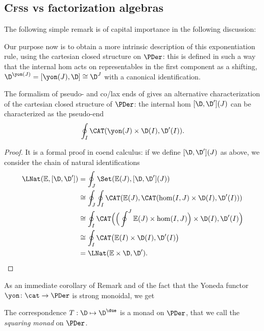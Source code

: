 \subsection{\textsc{Cfs}s vs factorization algebras}
The following simple remark is of capital importance in the following discussion:
\begin{remark}
Our purpose now is to obtain a more intrinsic description of this exponentiation rule, using the cartesian closed structure on $\PDer$: this is defined in such a way that the internal hom acts on representables in the first component as a shifting, \ie $\D^{\yon(J)} = [\yon(J),\D]\cong \D^J$ with a canonical identification. 
\end{remark}
\begin{remark}
The formalism of pseudo- and co/lax ends of \cite{bozapalides1975fins} gives an alternative characterization of the cartesian closed structure of $\PDer$: the internal hom $[\D,\D'](J)$ can be characterized as the pseudo-end
\[
\oint_I\CAT(\yon(J)\times \D(I), \D'(I)).
\]
\end{remark}
\begin{proof}
It is a formal proof in coend calculus: if we define $[\D,\D'](J)$ as above, we consider the chain of natural identifications
\begin{align*}
\LNat(\mathbb{E}, [\D,\D']) &= \oint_J \Set(\mathbb{E}(J), [\D,\D'](J))\\
&\cong \oint_J \oint_I \CAT(\mathbb{E}(J), \CAT(\hom(I,J)\times \D(I), \D'(I)))\\
&\cong \oint_I\CAT\Big(\Big(\oint^J \mathbb{E}(J) \times \hom(I,J)\Big)\times \D(I), \D'(I) \Big)\\
&\cong  \oint_I\CAT\big( \mathbb{E}(I)\times \D(I), \D'(I) \big)\\
&=\LNat(\mathbb{E}\times \D,\D').\qedhere
\end{align*}
\end{proof}
As an immediate corollary of Remark  and of the fact that the Yoneda functor $\yon\colon \cat \to \PDer$ is strong monoidal, we get 
\begin{proposition}
The correspondence $T:\D\mapsto \D^\due$ is a monad on $\PDer$, that we call the \emph{squaring monad} on $\PDer$.
\end{proposition}
